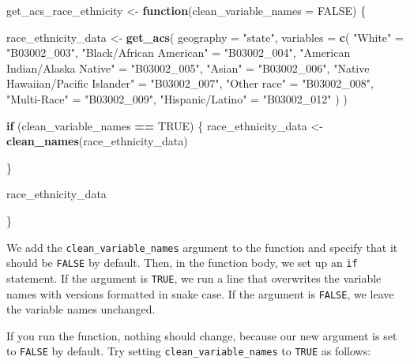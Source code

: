 \documentclass[
]{book}
\newenvironment{Shaded}{\begin{snugshade}}{\end{snugshade}}
\newcommand{\AttributeTok}[1]{\textcolor[rgb]{0.13,0.29,0.53}{#1}}
\newcommand{\ConstantTok}[1]{\textcolor[rgb]{0.56,0.35,0.01}{#1}}
\newcommand{\ControlFlowTok}[1]{\textcolor[rgb]{0.13,0.29,0.53}{\textbf{#1}}}
\newcommand{\FunctionTok}[1]{\textcolor[rgb]{0.13,0.29,0.53}{\textbf{#1}}}
\newcommand{\NormalTok}[1]{#1}
\newcommand{\OtherTok}[1]{\textcolor[rgb]{0.56,0.35,0.01}{#1}}
\newcommand{\SpecialCharTok}[1]{\textcolor[rgb]{0.81,0.36,0.00}{\textbf{#1}}}
\newcommand{\StringTok}[1]{\textcolor[rgb]{0.31,0.60,0.02}{#1}}
\begin{document}
\begin{Shaded}
\begin{Highlighting}[]
\NormalTok{get\_acs\_race\_ethnicity }\OtherTok{\textless{}{-}} \ControlFlowTok{function}\NormalTok{(}\AttributeTok{clean\_variable\_names =} \ConstantTok{FALSE}\NormalTok{) \{}
  
\NormalTok{  race\_ethnicity\_data }\OtherTok{\textless{}{-}}
    \FunctionTok{get\_acs}\NormalTok{(}
      \AttributeTok{geography =} \StringTok{"state"}\NormalTok{,}
      \AttributeTok{variables =} \FunctionTok{c}\NormalTok{(}
        \StringTok{"White"} \OtherTok{=} \StringTok{"B03002\_003"}\NormalTok{,}
        \StringTok{"Black/African American"} \OtherTok{=} \StringTok{"B03002\_004"}\NormalTok{,}
        \StringTok{"American Indian/Alaska Native"} \OtherTok{=} \StringTok{"B03002\_005"}\NormalTok{,}
        \StringTok{"Asian"} \OtherTok{=} \StringTok{"B03002\_006"}\NormalTok{,}
        \StringTok{"Native Hawaiian/Pacific Islander"} \OtherTok{=} \StringTok{"B03002\_007"}\NormalTok{,}
        \StringTok{"Other race"} \OtherTok{=} \StringTok{"B03002\_008"}\NormalTok{,}
        \StringTok{"Multi{-}Race"} \OtherTok{=} \StringTok{"B03002\_009"}\NormalTok{,}
        \StringTok{"Hispanic/Latino"} \OtherTok{=} \StringTok{"B03002\_012"}
\NormalTok{      )}
\NormalTok{    )}
  
  \ControlFlowTok{if}\NormalTok{ (clean\_variable\_names }\SpecialCharTok{==} \ConstantTok{TRUE}\NormalTok{) \{}
\NormalTok{    race\_ethnicity\_data }\OtherTok{\textless{}{-}} \FunctionTok{clean\_names}\NormalTok{(race\_ethnicity\_data)}
    
\NormalTok{  \}}
  
\NormalTok{  race\_ethnicity\_data}
  
\NormalTok{\}}
\end{Highlighting}
\end{Shaded}

We add the \texttt{clean\_variable\_names} argument to the function and specify that it should be \texttt{FALSE} by default. Then, in the function body, we set up an \texttt{if} statement. If the argument is \texttt{TRUE}, we run a line that overwrites the variable names with versions formatted in snake case. If the argument is \texttt{FALSE}, we leave the variable names unchanged.

If you run the function, nothing should change, because our new argument is set to \texttt{FALSE} by default. Try setting \texttt{clean\_variable\_names} to \texttt{TRUE} as follows:
\end{document}
